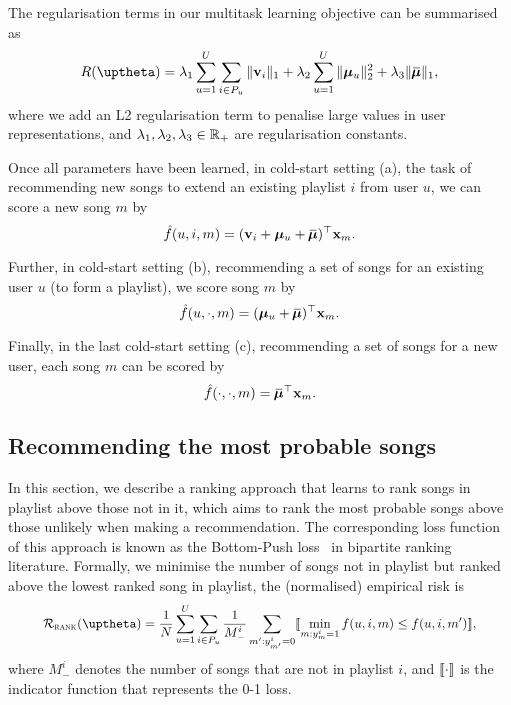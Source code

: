The regularisation terms in our multitask learning objective can be summarised as
\begin{equation}
\label{eq:reg}
R(\uptheta) = \lambda_1 \sum_{u=1}^U \sum_{i \in P_u} \|\bv_i\|_1 + \lambda_2 \sum_{u=1}^U \|\bmu_u\|_2^2 + \lambda_3 \|\widebar\bmu\|_1,
\end{equation}
where we add an L2 regularisation term to penalise large values in user representations,
and $\lambda_1, \lambda_2, \lambda_3 \in \mathbb{R}_+$ are regularisation constants.

Once all parameters have been learned, in cold-start setting (a), 
\ie the task of recommending new songs to extend an existing playlist $i$ from user $u$, 
we can score a new song $m$ by
$$
\hat f(u, i, m) = (\bv_i + \bmu_u + \widebar\bmu)^\top \x_m.
$$

Further, in cold-start setting (b), \ie recommending a set of songs for an existing user $u$ (to form a playlist), 
we score song $m$ by
$$
\hat f(u, \cdot, m) = (\bmu_u + \widebar\bmu)^\top \x_m.
$$

Finally, in the last cold-start setting (c), \ie recommending a set of songs for a new user, each song $m$ can be scored by
$$
\hat f(\cdot, \cdot, m) = \widebar\bmu^\top \x_m.
$$


\subsection{Recommending the most probable songs}
\label{ssec:bploss}

In this section, we describe a ranking approach that learns to rank songs in playlist above
those not in it, which aims to rank the most probable songs above those unlikely when making a recommendation.
The corresponding loss function of this approach is known as the Bottom-Push loss~\cite{rudin2009p} in bipartite ranking literature.
Formally, we minimise the number of songs not in playlist but ranked above the lowest ranked song in playlist,
\ie the (normalised) empirical risk is
\begin{equation}
\label{eq:bprisk}
\resizebox{.9\linewidth}{!}{$\displaystyle
\RCal_\textsc{rank}(\uptheta) = \frac{1}{N} \sum_{u=1}^U \sum_{i \in P_u} \frac{1}{M_-^i} \sum_{m': y_{m'}^i = 0} 
\llb \min_{m: y_m^i = 1} f(u, i, m) \le f(u, i, m') \rrb,
$}
\end{equation}
where $M_-^i$ denotes the number of songs that are not in playlist $i$,
and $\llbracket \cdot \rrbracket$ is the indicator function that represents the 0-1 loss.


